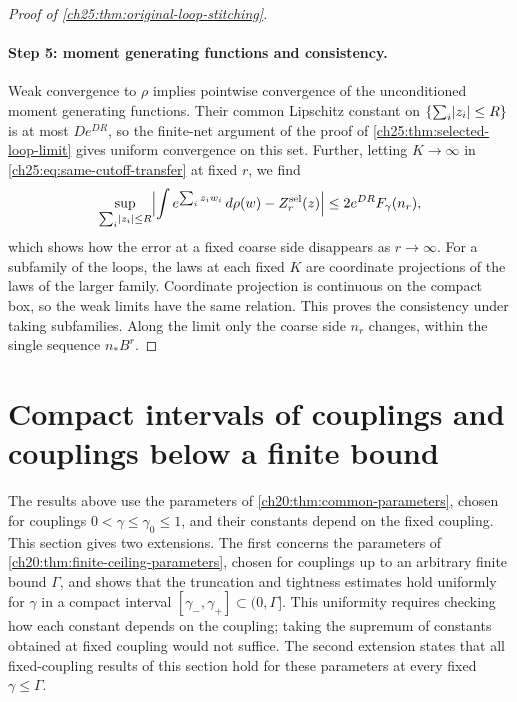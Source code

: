 \begin{proof}[Proof of \cref{ch25:thm:original-loop-stitching}]
\paragraph{Step 5: moment generating functions and consistency.}
Weak convergence to $\rho$ implies pointwise convergence of the unconditioned moment generating functions. Their common Lipschitz constant on $\{\sum_i\lvert z_i\rvert\le R\}$ is at most $De^{DR}$, so the finite-net argument of the proof of \cref{ch25:thm:selected-loop-limit} gives uniform convergence on this set. Further, letting $K\to\infty$ in \eqref{ch25:eq:same-cutoff-transfer} at fixed $r$, we find
\[
 \sup_{\sum_i\lvert z_i\rvert\le R}\Bigl\lvert\int e^{\sum_iz_iw_i}\,d\rho(w)-Z_r^{\mathrm{sel}}(z)\Bigr\rvert\le2e^{DR}F_\gamma(n_r),
\]
which shows how the error at a fixed coarse side disappears as $r\to\infty$. For a subfamily of the loops, the laws at each fixed $K$ are coordinate projections of the laws of the larger family. Coordinate projection is continuous on the compact box, so the weak limits have the same relation. This proves the consistency under taking subfamilies. Along the limit only the coarse side $n_r$ changes, within the single sequence $n_*B^r$.
\end{proof}

\section{Compact intervals of couplings and couplings below a finite bound}\label{ch25:sec:coupling}

The results above use the parameters of \cref{ch20:thm:common-parameters}, chosen for couplings $0<\gamma\le\gamma_0\le1$, and their constants depend on the fixed coupling. This section gives two extensions. The first concerns the parameters of \cref{ch20:thm:finite-ceiling-parameters}, chosen for couplings up to an arbitrary finite bound $\Gamma$, and shows that the truncation and tightness estimates hold uniformly for $\gamma$ in a compact interval $[\gamma_-,\gamma_+]\subset(0,\Gamma]$. This uniformity requires checking how each constant depends on the coupling; taking the supremum of constants obtained at fixed coupling would not suffice. The second extension states that all fixed-coupling results of this section hold for these parameters at every fixed $\gamma\le\Gamma$.

